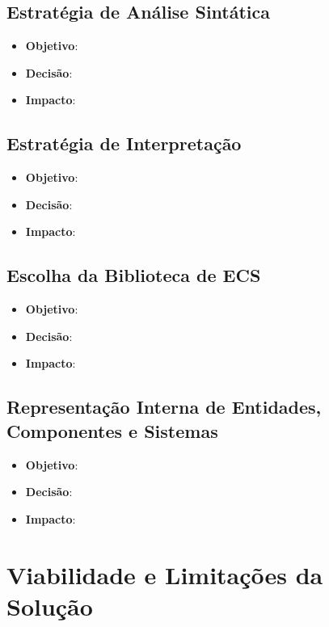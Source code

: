 \subsection{Estratégia de Análise Sintática}

\begin{itemize}
	\item \textbf{Objetivo}:
	\item \textbf{Decisão}:
	\item \textbf{Impacto}:
\end{itemize}

\subsection{Estratégia de Interpretação}

\begin{itemize}
	\item \textbf{Objetivo}:
	\item \textbf{Decisão}:
	\item \textbf{Impacto}:
\end{itemize}

\subsection{Escolha da Biblioteca de ECS}

\begin{itemize}
	\item \textbf{Objetivo}:
	\item \textbf{Decisão}:
	\item \textbf{Impacto}:
\end{itemize}

\subsection{Representação Interna de Entidades, Componentes e Sistemas}

\begin{itemize}
	\item \textbf{Objetivo}:
	\item \textbf{Decisão}:
	\item \textbf{Impacto}:
\end{itemize}

\section{Viabilidade e Limitações da Solução}
